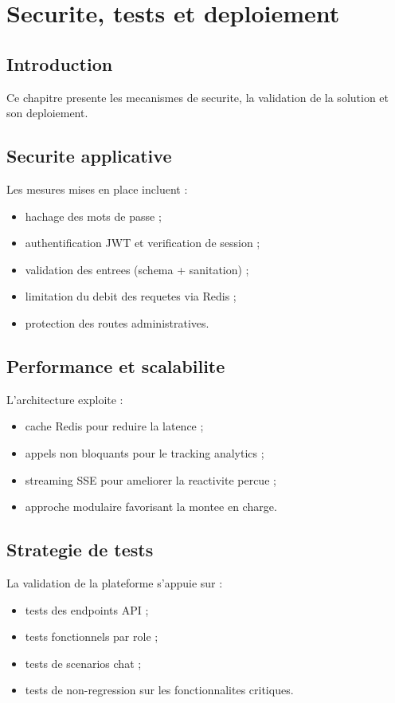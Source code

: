 \chapter{Securite, tests et deploiement}

\section{Introduction}
Ce chapitre presente les mecanismes de securite, la validation de la solution et son deploiement.

\section{Securite applicative}
Les mesures mises en place incluent :
\begin{itemize}
  \item hachage des mots de passe ;
  \item authentification JWT et verification de session ;
  \item validation des entrees (schema + sanitation) ;
  \item limitation du debit des requetes via Redis ;
  \item protection des routes administratives.
\end{itemize}

\section{Performance et scalabilite}
L'architecture exploite :
\begin{itemize}
  \item cache Redis pour reduire la latence ;
  \item appels non bloquants pour le tracking analytics ;
  \item streaming SSE pour ameliorer la reactivite percue ;
  \item approche modulaire favorisant la montee en charge.
\end{itemize}

\section{Strategie de tests}
La validation de la plateforme s'appuie sur :
\begin{itemize}
  \item tests des endpoints API ;
  \item tests fonctionnels par role ;
  \item tests de scenarios chat ;
  \item tests de non-regression sur les fonctionnalites critiques.
\end{itemize}

